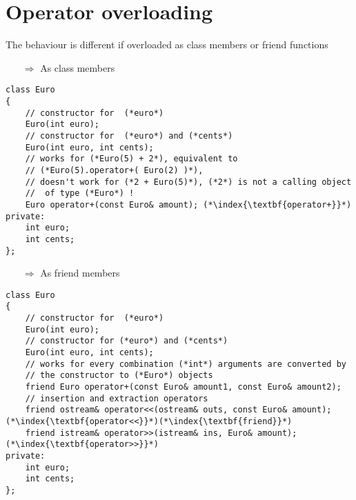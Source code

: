 \documentclass[10pt]{article}
\begin{document}
\section{Operator overloading}
\small
The behaviour is different if overloaded as class members or 
friend functions
\begin{enumerate}
\item[$\Rightarrow$] As class members
\end{enumerate}
\begin{lstlisting}
class Euro
{
    // constructor for  (*euro*)
    Euro(int euro);
    // constructor for  (*euro*) and (*cents*)
    Euro(int euro, int cents);
    // works for (*Euro(5) + 2*), equivalent to 
    // (*Euro(5).operator+( Euro(2) )*),
    // doesn't work for (*2 + Euro(5)*), (*2*) is not a calling object
    //  of type (*Euro*) !
    Euro operator+(const Euro& amount); (*\index{\textbf{operator+}}*)
private:
    int euro;
    int cents;
};
\end{lstlisting}
\begin{enumerate}
\item[$\Rightarrow$] As friend members
\end{enumerate}
\begin{lstlisting}
class Euro
{
    // constructor for  (*euro*)
    Euro(int euro);
    // constructor for (*euro*) and (*cents*)
    Euro(int euro, int cents);
    // works for every combination (*int*) arguments are converted by 
    // the constructor to (*Euro*) objects
    friend Euro operator+(const Euro& amount1, const Euro& amount2);
    // insertion and extraction operators
    friend ostream& operator<<(ostream& outs, const Euro& amount);(*\index{\textbf{operator<<}}*)(*\index{\textbf{friend}}*)
    friend istream& operator>>(istream& ins, Euro& amount);(*\index{\textbf{operator>>}}*)
private:
    int euro;
    int cents;
};
\end{lstlisting}
%
%
\end{document}
